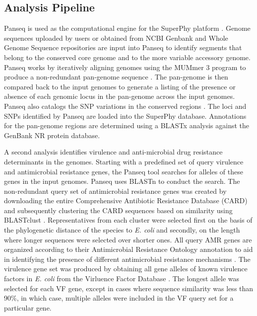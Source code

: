 \documentclass[a4paper,twoside]{article}
\begin{document}
\subsection{Analysis Pipeline}
\label{sec:pipeline}

Panseq is used as the computational engine for the SuperPhy platform \cite{laing_pan-genome_2010}. Genome sequences uploaded by users or obtained from NCBI Genbank and Whole Genome Sequence repositories \cite{benson2013genbank} are input into Panseq to identify segments that belong to the conserved core genome and to the more variable accessory genome. Panseq works by iteratively aligning genomes using the MUMmer 3 program to produce a non-redundant pan-genome sequence \cite{laing_pan-genome_2010,kurtz2004versatile}. The pan-genome is then compared back to the input genomes to generate a listing of the presence or absence of each genomic locus in the pan-genome across the input genomes. Panseq also catalogs the SNP variations in the conserved regions \cite{laing_pan-genome_2010}.  The loci and SNPs identified by Panseq are loaded into the SuperPhy database. Annotations for the pan-genome regions are determined using a BLASTx analysis against the GenBank NR protein database.

A second analysis identifies virulence and anti-microbial drug resistance determinants in the genomes. Starting with a predefined set of query virulence and antimicrobial resistance genes, the Panseq tool searches for alleles of these genes in the input genomes. Panseq uses BLASTn to conduct the search. The non-redundant query set of antimicrobial resistance genes was created by downloading the entire Comprehensive Antibiotic Resistance Database (CARD) \cite{mcarthur2012card} and subsequently clustering the CARD sequences based on similarity using BLASTclust \cite{altschul_gapped_1997}. Representatives from each cluster were selected first on the basis of the phylogenetic distance of the species to \textit{E. coli} and secondly, on the length where longer sequences were selected over shorter ones. All query AMR genes are organized according to their Antimicrobial Resistance Ontology annotation to aid in identifying the presence of different antimicrobial resistance mechanisms \cite{antezana_biological_2009}. The virulence gene set was produced by obtaining all gene alleles of known virulence factors in \textit{E. coli} from the Virluence Factor Database \cite{chen2012vfdb,chen2005vfdb}.  The longest allele was selected for each VF gene, except in cases where sequence similarity was less than 90\%, in which case, multiple alleles were included in the VF query set for a particular gene.
\end{document}
